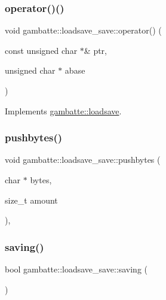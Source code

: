 \subsubsection{\texorpdfstring{operator()()}{operator()()}\hspace{0.1cm}{\footnotesize\ttfamily [19/19]}}
{\footnotesize\ttfamily void gambatte\+::loadsave\+\_\+save\+::operator() (\begin{DoxyParamCaption}\item[{const unsigned char $\ast$\&}]{ptr,  }\item[{unsigned char $\ast$}]{abase }\end{DoxyParamCaption})\hspace{0.3cm}{\ttfamily [virtual]}}



Implements \hyperlink{classgambatte_1_1loadsave_a57518c27d7844ae48faea91fc04a680a}{gambatte\+::loadsave}.

\mbox{\label{classgambatte_1_1loadsave__save_a5a57720d47f7b664ea19da4ea3b12e04}} 
\subsubsection{\texorpdfstring{pushbytes()}{pushbytes()}}
{\footnotesize\ttfamily void gambatte\+::loadsave\+\_\+save\+::pushbytes (\begin{DoxyParamCaption}\item[{char $\ast$}]{bytes,  }\item[{size\+\_\+t}]{amount }\end{DoxyParamCaption})\hspace{0.3cm}{\ttfamily [inline]}, {\ttfamily [private]}}

\mbox{\label{classgambatte_1_1loadsave__save_a61ddca93672c2924df92e9f5652dd849}} 
\subsubsection{\texorpdfstring{saving()}{saving()}}
{\footnotesize\ttfamily bool gambatte\+::loadsave\+\_\+save\+::saving (\begin{DoxyParamCaption}{ }\end{DoxyParamCaption})\hspace{0.3cm}{\ttfamily [virtual]}}



